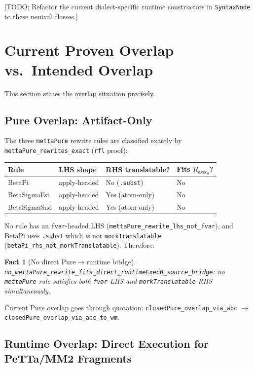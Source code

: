 \documentclass[11pt]{article}
\newtheorem{fact}[theorem]{Fact}
\theoremstyle{remark}
\newcommand{\code}[1]{\texttt{#1}}
\newcommand{\leanref}[1]{\texttt{#1}}
\newcommand{\TODO}[1]{\textcolor{red!60!black}{[TODO: #1]}}
\begin{document}
\TODO{Refactor the current dialect-specific runtime constructors in
\code{SyntaxNode} to these neutral classes.}

\section{Current Proven Overlap vs.\ Intended Overlap}
\label{sec:overlap}

This section states the overlap situation precisely.

\subsection{Pure Overlap: Artifact-Only}

The three \code{mettaPure} rewrite rules are classified exactly by
\leanref{mettaPure\_rewrites\_exact} (\code{rfl} proof):

\begin{center}
\small
\begin{tabular}{@{}llll@{}}
\toprule
Rule & LHS shape & RHS translatable? & Fits $R_{\mathrm{exec}_0}$? \\
\midrule
BetaPi & apply-headed & No (\code{.subst}) & No \\
BetaSigmaFst & apply-headed & Yes (atom-only) & No \\
BetaSigmaSnd & apply-headed & Yes (atom-only) & No \\
\bottomrule
\end{tabular}
\end{center}

\noindent
No rule has an \code{fvar}-headed LHS
(\leanref{mettaPure\_rewrite\_lhs\_not\_fvar}),
and BetaPi uses \code{.subst} which is not \leanref{morkTranslatable}
(\leanref{betaPi\_rhs\_not\_morkTranslatable}).
Therefore:

\begin{fact}[No direct Pure$\to$runtime bridge]
\leanref{no\_mettaPure\_rewrite\_fits\_direct\_runtimeExec0\_source\_bridge}:
no \code{mettaPure} rule satisfies both \code{fvar}-LHS and
\leanref{morkTranslatable}-RHS simultaneously.
\end{fact}

\noindent
Current Pure overlap goes through quotation:
\leanref{closedPure\_overlap\_via\_abc} $\to$
\leanref{closedPure\_overlap\_via\_abc\_to\_wm}.

\subsection{Runtime Overlap: Direct Execution for PeTTa/MM2 Fragments}
\end{document}
